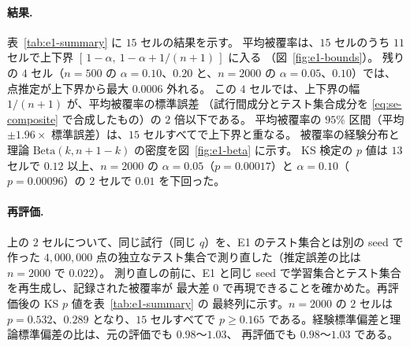 \documentclass[a4paper,11pt]{jsarticle}
\theoremstyle{definition}
\theoremstyle{plain}
\theoremstyle{remark}
\newcommand{\qhat}{\hat{q}}
\begin{document}
\paragraph{結果.}
表~\ref{tab:e1-summary} に $15$ セルの結果を示す。
平均被覆率は、$15$ セルのうち $11$ セルで上下界 $[\,1-\alpha,\ 1-\alpha+1/(n+1)\,]$ に入る
（図~\ref{fig:e1-bounds}）。
残りの $4$ セル（$n=500$ の $\alpha=0.10$、$0.20$ と、$n=2000$ の $\alpha=0.05$、$0.10$）では、
点推定が上下界から最大 $0.0006$ 外れる。
この $4$ セルでは、上下界の幅 $1/(n+1)$ が、平均被覆率の標準誤差
（試行間成分とテスト集合成分を \eqref{eq:se-composite} で合成したもの）の $2$ 倍以下である。
平均被覆率の $95\%$ 区間（平均 $\pm1.96\times$ 標準誤差）は、$15$ セルすべてで上下界と重なる。
被覆率の経験分布と理論 $\mathrm{Beta}(k,n+1-k)$ の密度を図~\ref{fig:e1-beta} に示す。
KS 検定の $p$ 値は $13$ セルで $0.12$ 以上、$n=2000$ の $\alpha=0.05$（$p=0.00017$）と
$\alpha=0.10$（$p=0.00096$）の $2$ セルで $0.01$ を下回った。

\paragraph{再評価.}
上の $2$ セルについて、同じ試行（同じ $\qhat$）を、E1 のテスト集合とは別の seed で作った
$4{,}000{,}000$ 点の独立なテスト集合で測り直した（推定誤差の比は $n=2000$ で $0.022$）。
測り直しの前に、E1 と同じ seed で学習集合とテスト集合を再生成し、記録された被覆率が
最大差 $0$ で再現できることを確かめた。再評価後の KS $p$ 値を表~\ref{tab:e1-summary} の
最終列に示す。$n=2000$ の $2$ セルは $p=0.532$、$0.289$ となり、$15$ セルすべてで
$p\ge0.165$ である。経験標準偏差と理論標準偏差の比は、元の評価でも $0.98$〜$1.03$、
再評価でも $0.98$〜$1.03$ である。
\end{document}
